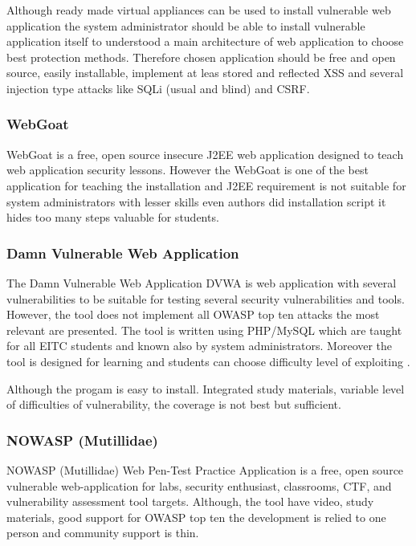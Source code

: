Although ready made virtual appliances can be used to install vulnerable web application the
system administrator should be able to install vulnerable application itself to understood a main architecture of web application to choose best protection methods. Therefore chosen application should be free and open source, easily installable, implement at leas stored and reflected \gls{XSS} and several injection type attacks like \gls{SQLi} (usual and blind) and \gls{CSRF}.

\subsubsection{WebGoat}
WebGoat is a free, open source insecure J2EE web application designed to teach web application security lessons.  However the WebGoat is one of the best application for teaching the installation and J2EE requirement is not suitable for system administrators with lesser skills even authors did installation script it hides too many steps valuable for students. 


\subsubsection{Damn Vulnerable Web Application}
The Damn Vulnerable Web Application \gls{DVWA} is web application with several vulnerabilities to be suitable for testing several security vulnerabilities and tools. However, the tool does not implement all \gls{OWASP} top ten attacks the most relevant are presented. The tool is written using PHP/MySQL which are taught for all \gls{EITC} students and known also by system administrators. Moreover the tool is designed for learning and students can choose difficulty level of exploiting \citep{website:dvwa}.

Although the progam is easy to install. Integrated study materials, variable level of  difficulties of vulnerability, the coverage is not best but sufficient.

\subsubsection{NOWASP (Mutillidae)}
NOWASP (Mutillidae) Web Pen-Test Practice Application is a free, open source vulnerable web-application for labs, security enthusiast, classrooms, \gls{CTF}, and vulnerability assessment tool targets. \citep{website:Mutillidae} Although, the tool have video, study materials, good support for \gls{OWASP} top ten the development is relied to one person and community support is thin.
